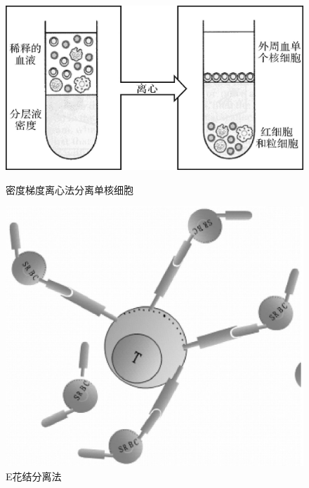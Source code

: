   \begin{figure}[!htbp]
    \centering
    \begin{minipage}[b]{0.45\textwidth} 
        \centering
        \includegraphics[height=.2\textheight]{./images/Image00176.jpg}
        \captionsetup{justification=centering}
        \caption{密度梯度离心法分离单核细胞}
        \label{fig10-22}
    \end{minipage}
\hspace{0.04\textwidth}%
\begin{minipage}[b]{0.45\textwidth} 
    \centering
    \includegraphics[height=.2\textheight]{./images/Image00177.jpg}
    \captionsetup{justification=centering}
    \caption{E花结分离法}
    \label{fig10-23}
\end{minipage}
\end{figure} 

